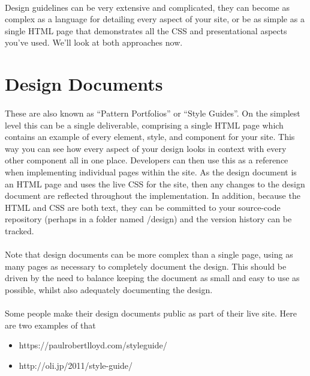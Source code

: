 \paragraph{} Design guidelines can be very extensive and complicated, they can become as complex as a language for detailing every aspect of your site, or be as simple as a single HTML page that demonstrates all the CSS and presentational aspects you’ve used. We'll look at both approaches now.

\section{Design Documents}
\paragraph{} These are also known as ``Pattern Portfolios'' or ``Style Guides''. On the simplest level this can be a single deliverable, comprising a single HTML page which contains an example of every element, style, and component for your site. This way you can see how every aspect of your design looks in context with every other component all in one place. Developers can then use this as a reference when implementing individual pages within the site. As the design document is an HTML page and uses the live CSS for the site, then any changes to the design document are reflected throughout the implementation. In addition, because the HTML and CSS are both text, they can be committed to your source-code repository (perhaps in a  folder named /design) and the version history can be tracked. 
\paragraph{} Note that design documents can be more complex than a single page, using as many pages as necessary to completely document the design. This should be driven by the need to balance keeping the document as small and easy to use as possible, whilst also adequately documenting the design.
\paragraph{} Some people make their design documents public as part of their live site. Here are two examples of that

\begin{itemize}
	\item https://paulrobertlloyd.com/styleguide/
	\item http://oli.jp/2011/style-guide/
\end{itemize}



